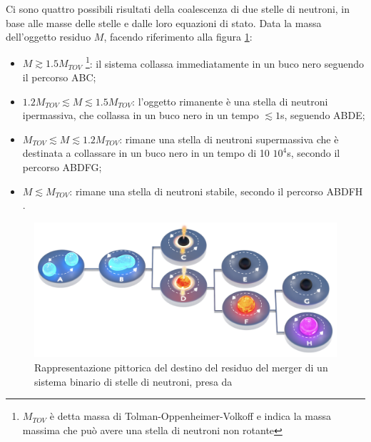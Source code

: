 Ci sono quattro possibili risultati della coalescenza di due stelle di neutroni, in base alle masse delle stelle e dalle loro equazioni di stato. 
Data la massa dell'oggetto residuo $M$, facendo riferimento alla figura \ref{fig:EvoluzioneBNS}:
\begin{itemize}
	\item $M\gtrsim 1.5 M_{TOV}$ \footnote{$M_{TOV}$ è detta massa di Tolman-Oppenheimer-Volkoff e indica la massa massima che può avere una stella di neutroni non rotante}: il sistema collassa immediatamente in un buco nero seguendo il percorso A\textrightarrow B\textrightarrow C;
	\item $1.2 M_{TOV} \lesssim M \lesssim 1.5 M_{TOV}$: l'oggetto rimanente è una stella di neutroni ipermassiva, che collassa in un buco nero in un tempo $\lesssim 1$s, seguendo A\textrightarrow B\textrightarrow D\textrightarrow E;		
	\item $M_{TOV} \lesssim M \lesssim 1.2 M_{TOV}$: rimane una stella di neutroni supermassiva che è destinata a collassare in un buco nero in un tempo di 10 \textdiv $10^4$s, secondo il percorso A\textrightarrow B\textrightarrow D\textrightarrow F\textrightarrow G;		\item $M\lesssim M_{TOV}$: rimane una stella di neutroni stabile, secondo il percorso A\textrightarrow B\textrightarrow D\textrightarrow F\textrightarrow H \cite{sarin2020evolution}.	
\end{itemize}
\begin{center}
	\begin{figure}[ht]
		\centering
		\includegraphics[scale=0.25, angle=0]{figures/Capitolo_1/MagnetarEvolution.png}
		\setlength{\belowcaptionskip}{-20pt}
		\caption{Rappresentazione pittorica del destino del residuo del merger di un sistema binario di stelle di neutroni, presa da \cite{sarin2020evolution}}
		\label{fig:EvoluzioneBNS}
	\end{figure}
\end{center}

